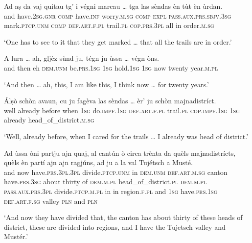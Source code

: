 \begin{linenumbers}
\gll  Ad aṣ da vaj quitau tg’ i végni marcau … tga las sèndas èn tùt èn ùrdan.  \\
and have.\textsc{2sg.gnr} \textsc{comp} have.\textsc{inf} worry.\textsc{m.sg} \textsc{comp} \textsc{expl} \textsc{pass.aux.prs.sbjv.3sg} mark.\textsc{ptcp.unm} {} \textsc{comp} \textsc{def.art.f.pl} trail.\textsc{pl} \textsc{cop.prs.3pl} all in order.\textsc{m.sg}  \\
\end{linenumbers}
\medskip
\glt `One has to see to it that they get marked … that all the trails are in order.'
\medskip

\begin{linenumbers}
\gll  A lura … ah, gljèz sùnd ju, tégn ju ùssa … végn òns.  \\
and then {} eh \textsc{dem.unm} be.\textsc{prs.1sg} \textsc{1sg} hold.\textsc{1sg}  \textsc{1sg} now {} twenty year.\textsc{m.pl} \\
\end{linenumbers} 
\medskip
\glt `And then … ah, this, I am like this, I think now … for twenty years.'
\medskip

\begin{linenumbers}
\gll  Álṣò schòn avaun, cu ju fagèva las sèndas … èr’ ju schòn majnadistríct.  \\
well already before when \textsc{1sg} do.\textsc{impf.1sg} \textsc{def.art.f.pl} trail.\textsc{pl} {} \textsc{cop.impf.1sg} \textsc{1sg} already head\_of\_district.\textsc{m.sg}\\
\end{linenumbers}
\medskip
\glt `Well, already before, when I cared for the trails … I already was head of district.'
\medskip

\begin{linenumbers}
\gll Ad ùssa òni partju ajn quaj, al cantún ò circa trènta da quèls majnadistrícts, quèls èn partí ajn ajn ragjúns, ad ju a la val Tujétsch a Musté.\footnotemark   \\
and now have.\textsc{prs.3pl.3pl} divide.\textsc{ptcp.unm} in \textsc{dem.unm} \textsc{def.art.m.sg} canton  have.\textsc{prs.3sg} about thirty of \textsc{dem.m.pl} head\_of\_district.\textsc{pl} \textsc{dem.m.pl} \textsc{pass.aux.prs.3pl} divide.\textsc{ptcp.m.pl} in in region.\textsc{f.pl} and \textsc{1sg} have.\textsc{prs.1sg} \textsc{def.art.f.sg} valley \textsc{pln} and \textsc{pln}\\
\end{linenumbers}
\medskip
\glt `And now they have divided that, the canton has about thirty of these heads of district, these are divided into regions, and I have the Tujetsch valley and Mustér.'
\medskip


